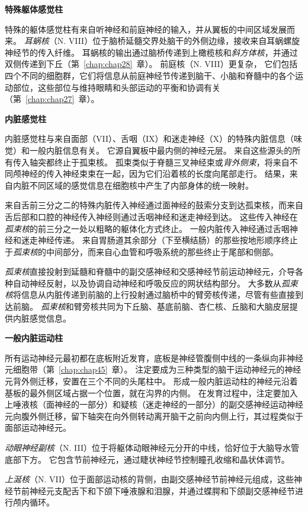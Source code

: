 \textbf{特殊躯体感觉柱}

特殊的躯体感觉柱有来自听神经和前庭神经的输入，并从翼板的中间区域发展而来。
\textit{耳蜗核}（N. VIII）位于脑桥延髓交界处脑干的外侧边缘，接收来自耳蜗螺旋神经节的传入纤维。
耳蜗核的输出通过脑桥传递到上橄榄核和\textit{斜方体核}，并通过双侧传递到下丘（第~\ref{chap:chap28}~章）。
前庭核（N. VIII）更复杂，
它们包括四个不同的细胞群，它们将信息从前庭神经节传递到脑干、小脑和脊髓中的各个运动部位，这些部位与维持眼睛和头部运动的平衡和协调有关（第~\ref{chap:chap27}~章）。


\textbf{内脏感觉柱}

内脏感觉柱与来自面部（VII）、舌咽（IX）和迷走神经（X）的特殊内脏信息（味觉）和一般内脏信息有关。
它源自翼板中最内侧的神经元层。
来自这些源头的所有传入轴突都终止于孤束核。
孤束类似于脊髓三叉神经束或\textit{背外侧束}，将来自不同颅神经的传入神经束束在一起，因为它们沿着核的长度向尾部走行。
结果，来自内脏不同区域的感觉信息在细胞核中产生了内部身体的统一映射。


来自舌前三分之二的特殊内脏传入神经通过面神经的鼓索分支到达孤束核，而来自舌后部和口腔的神经传入神经则通过舌咽神经和迷走神经到达。
这些传入神经在\textit{孤束核}的前三分之一处以粗略的躯体化方式终止。
一般内脏传入神经通过舌咽神经和迷走神经传递。
来自胃肠道其余部分（下至横结肠）的那些按地形顺序终止于\textit{孤束核}的中间部分，而来自心血管和呼吸系统的那些终止于尾部和侧部。


\textit{孤束核}直接投射到延髓和脊髓中的副交感神经和交感神经节前运动神经元，介导各种自动神经反射，以及协调自动神经和呼吸反应的网状结构部分。
大多数从\textit{孤束核}将信息从内脏传递到前脑的上行投射通过脑桥中的臂旁核传递，尽管有些直接到达前脑。
\textit{孤束核}和臂旁核共同为下丘脑、基底前脑、杏仁核、丘脑和大脑皮层提供内脏感觉信息。


\textbf{一般内脏运动柱}

所有运动神经元最初都在底板附近发育，底板是神经管腹侧中线的一条纵向非神经元细胞带（第~\ref{chap:chap45}~章）。
注定要成为三种类型的脑干运动神经元的神经元背外侧迁移，安置在三个不同的头尾柱中。
形成一般内脏运动柱的神经元沿着基板的最外侧区域占据一个位置，就在沟界的内侧。
在发育过程中，注定要加入上唾液核（面神经的一部分）和疑核（迷走神经的一部分）的副交感神经运动神经元向腹外侧迁移，留下轴突在向外侧转动离开脑干之前向内侧上行，其过程类似于面部运动神经元。


\textit{动眼神经副核}（N. III）位于将躯体动眼神经元分开的中线，恰好位于大脑导水管底部下方。
它包含节前神经元，通过睫状神经节控制瞳孔收缩和晶状体调节。


\textit{上涎核}（N. VII）位于面部运动核的背侧，由副交感神经节前神经元组成，这些神经节前神经元支配舌下和下颌下唾液腺和泪腺，并通过蝶腭和下颌副交感神经节进行颅内循环。


